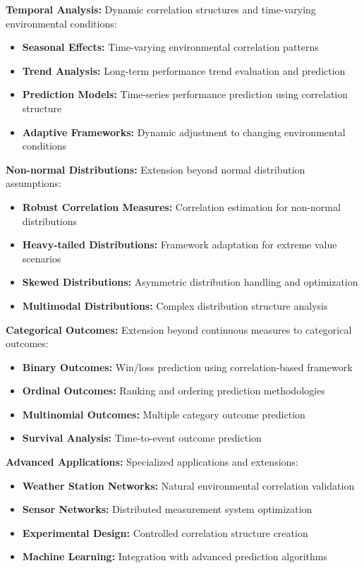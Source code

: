 \textbf{Temporal Analysis:}
Dynamic correlation structures and time-varying environmental conditions:
\begin{itemize}
    \item \textbf{Seasonal Effects:} Time-varying environmental correlation patterns
    \item \textbf{Trend Analysis:} Long-term performance trend evaluation and prediction
    \item \textbf{Prediction Models:} Time-series performance prediction using correlation structure
    \item \textbf{Adaptive Frameworks:} Dynamic adjustment to changing environmental conditions
\end{itemize}

\textbf{Non-normal Distributions:}
Extension beyond normal distribution assumptions:
\begin{itemize}
    \item \textbf{Robust Correlation Measures:} Correlation estimation for non-normal distributions
    \item \textbf{Heavy-tailed Distributions:} Framework adaptation for extreme value scenarios
    \item \textbf{Skewed Distributions:} Asymmetric distribution handling and optimization
    \item \textbf{Multimodal Distributions:} Complex distribution structure analysis
\end{itemize}

\textbf{Categorical Outcomes:}
Extension beyond continuous measures to categorical outcomes:
\begin{itemize}
    \item \textbf{Binary Outcomes:} Win/loss prediction using correlation-based framework
    \item \textbf{Ordinal Outcomes:} Ranking and ordering prediction methodologies
    \item \textbf{Multinomial Outcomes:} Multiple category outcome prediction
    \item \textbf{Survival Analysis:} Time-to-event outcome prediction
\end{itemize}

\textbf{Advanced Applications:}
Specialized applications and extensions:
\begin{itemize}
    \item \textbf{Weather Station Networks:} Natural environmental correlation validation
    \item \textbf{Sensor Networks:} Distributed measurement system optimization
    \item \textbf{Experimental Design:} Controlled correlation structure creation
    \item \textbf{Machine Learning:} Integration with advanced prediction algorithms
\end{itemize}

